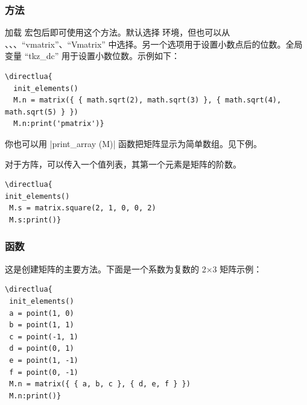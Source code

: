 \subsubsection{方法 }
\label{ssub:method_print}

加载  宏包后即可使用这个方法。默认选择  环境，但也可以从 、、、“vmatrix”、“Vmatrix” 中选择。另一个选项用于设置小数点后的位数。全局变量 “tkz\_dc” 用于设置小数位数。示例如下：

\vspace{.5em}
\begin{verbatim}
\directlua{
  init_elements()
  M.n = matrix({ { math.sqrt(2), math.sqrt(3) }, { math.sqrt(4), math.sqrt(5) } })
  M.n:print('pmatrix')}
\end{verbatim}



\vspace{.5em}
你也可以用 |print_array (M)| 函数把矩阵显示为简单数组。见下例。

对于方阵，可以传入一个值列表，其第一个元素是矩阵的阶数。

\vspace{.5em}
\begin{minipage}{.5\textwidth}
\begin{verbatim}
\directlua{
init_elements()
 M.s = matrix.square(2, 1, 0, 0, 2)
 M.s:print()}
  \end{verbatim}
\end{minipage}
\begin{minipage}{.5\textwidth}
\end{minipage}

\subsubsection{函数 }
\label{ssub:method_new}

这是创建矩阵的主要方法。下面是一个系数为复数的 2×3 矩阵示例：

\vspace{.5em}
\begin{minipage}{.5\textwidth}
\begin{verbatim}
\directlua{
 init_elements()
 a = point(1, 0)
 b = point(1, 1)
 c = point(-1, 1)
 d = point(0, 1)
 e = point(1, -1)
 f = point(0, -1)
 M.n = matrix({ { a, b, c }, { d, e, f } })
 M.n:print()}
\end{verbatim}
\end{minipage}
\begin{minipage}{.5\textwidth}
\end{minipage}

